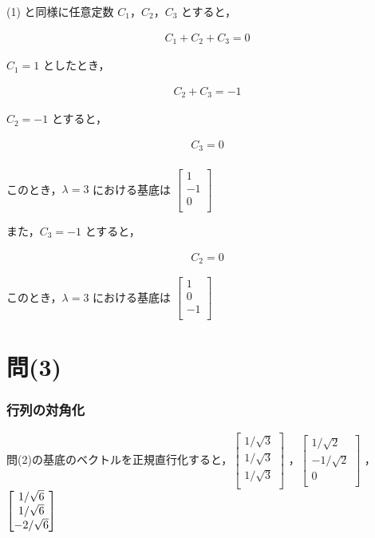 \documentclass[a4paper]{jsarticle}
\begin{document}
(1) と同様に任意定数 $C_1$，$C_2$，$C_3$ とすると，

\begin{eqnarray*}
	C_1 + C_2 + C_3 = 0
\end{eqnarray*}

$C_1 = 1$ としたとき，

\begin{eqnarray*}
	C_2 + C_3 = -1
\end{eqnarray*}

$C_2 = -1$ とすると，

\begin{eqnarray*}
	C_3 = 0
\end{eqnarray*}\\

このとき，$\lambda = 3$ における基底は
\underline{$
		\begin{bmatrix}
			1  \\
			-1 \\
			0  \\
		\end{bmatrix}
	$}

また，$C_3 = -1$ とすると，

\begin{eqnarray*}
	C_2 = 0
\end{eqnarray*}

このとき，$\lambda = 3$ における基底は
\underline{$
		\begin{bmatrix}
			1  \\
			0  \\
			-1 \\
		\end{bmatrix}
	$}

\section*{問(3)}

\subsubsection*{行列の対角化}

問(2)の基底のベクトルを正規直行化すると，$	\begin{bmatrix}
		1/\sqrt{3} \\
		1/\sqrt{3} \\
		1/\sqrt{3} \\
	\end{bmatrix} $
，$
	\begin{bmatrix}
		1/\sqrt{2}  \\
		-1/\sqrt{2} \\
		0           \\
	\end{bmatrix}
$
，$
	\begin{bmatrix}
		1/\sqrt{6}  \\
		1/\sqrt{6}  \\
		-2/\sqrt{6} \\
	\end{bmatrix}\\
$\\
\end{document}
